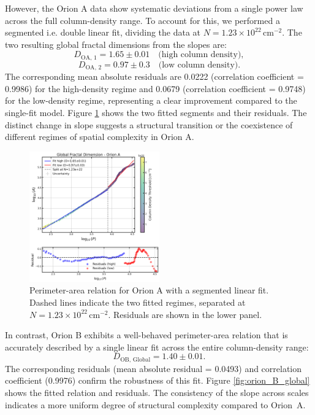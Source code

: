 However, the Orion A data show systematic deviations from a single power law across the full column-density range. To account for this, we performed a segmented i.e. double linear fit, dividing the data at \(N = 1.23 \times 10^{22}\,\mathrm{cm}^{-2}\). The two resulting global fractal dimensions from the slopes are:
\[
D_{\mathrm{OA,\,1}} = 1.65 \pm 0.01 \quad \text{(high column density)},
\]
\[
D_{\mathrm{OA,\,2}} = 0.97 \pm 0.3 \quad \text{(low column density)}.
\]
The corresponding mean absolute residuals are 0.0222 (correlation coefficient = 0.9986) for the high-density regime and 0.0679 (correlation coefficient = 0.9748) for the low-density regime, representing a clear improvement compared to the single-fit model.  
Figure \ref{fig:orion_A_global_double_fit} shows the two fitted segments and their residuals. The distinct change in slope suggests a structural transition or the coexistence of different regimes of spatial complexity in Orion A.

\begin{figure}[t]
    \centering
    \includegraphics[width=0.5\textwidth]{figures/orion_A_global_double_fit.png}
    \caption{Perimeter-area relation for Orion A with a segmented linear fit. Dashed lines indicate the two fitted regimes, separated at \(N = 1.23 \times 10^{22}\,\mathrm{cm}^{-2}\). Residuals are shown in the lower panel.}
    \label{fig:orion_A_global_double_fit}
\end{figure}

In contrast, Orion B exhibits a well-behaved perimeter-area relation that is accurately described by a single linear fit across the entire column-density range:
\[
D_{\mathrm{OB,\,Global}} = 1.40 \pm 0.01 .
\]
The corresponding residuals (mean absolute residual = 0.0493) and correlation coefficient (0.9976) confirm the robustness of this fit. Figure \ref{fig:orion_B_global} shows the fitted relation and residuals. The consistency of the slope across scales indicates a more uniform degree of structural complexity compared to Orion~A.

